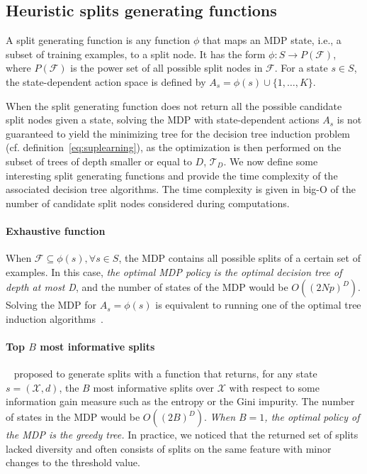 \subsection{Heuristic splits generating functions}\label{sec:testgen}

A split generating function is any function $\phi$ that maps an MDP state, i.e., a subset of training examples, to a split node. It has the form $\phi: S \rightarrow P(\mathcal{F})$, where $P(\mathcal{F})$ is the power set of all possible split nodes in $\mathcal F$. 
For a state $s \in S$, the state-dependent action space is defined by $A_s = \phi(s) \cup  \{1,\ldots,K\}$. 

When the split generating function does not return all the possible candidate split nodes given a state, solving the MDP with state-dependent actions $A_s$ is not guaranteed to yield the minimizing tree for the decision tree induction problem (cf. definition~\ref{eq:suplearning}), as the 
optimization is then performed on the subset of trees of depth smaller or equal to $D$, $\mathcal{T}_D$. 
We now define some interesting split generating functions and provide the time complexity of the associated decision tree algorithms. The time complexity is given in big-O of the number of candidate split nodes considered during computations. 

\paragraph{Exhaustive function} When $\mathcal{F} \subseteq \phi(s), \forall s \in S$, the MDP contains all possible splits of a certain set of examples. In this case, \textit{the optimal MDP policy is the optimal decision tree of depth at most D},
and the number of states of the MDP would be $O({(2Np)}^D)$. Solving the MDP for $A_s = \phi(s)$ is equivalent to running one of the optimal tree induction algorithms~\cite{verwer2017learning,oct,pystreed,quantbnb,binoct,murtree,mfoct,blossom,lin2020generalized,chaouki2024branchesfastdynamicprogramming}.

\paragraph{Top $B$ most informative splits}\label{topk-heuristic}~\cite{topk} proposed to generate splits with a function that returns, for any state $s=(\mathcal{X},d)$, the $B$ most informative splits over $\mathcal{X}$ with respect to some information gain measure such as the entropy or the Gini impurity. 
The number of states in the MDP would be $O({(2B)}^D)$. \textit{When $B=1$, the optimal policy of the MDP is the greedy tree.} 
In practice, we noticed that the returned set of splits lacked diversity and often consists of splits on the same feature with minor changes to the threshold value. 

